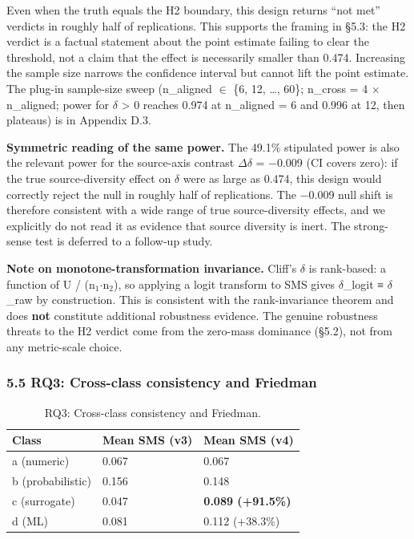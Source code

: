 \documentclass[review,12pt,authoryear]{elsarticle}
\begin{document}
Even when the truth equals the H2 boundary, this design returns ``not
met'' verdicts in roughly half of replications. This supports the
framing in §5.3: the H2 verdict is a factual statement about the point
estimate failing to clear the threshold, not a claim that the effect is
necessarily smaller than 0.474. Increasing the sample size narrows the
confidence interval but cannot lift the point estimate. The plug-in
sample-size sweep (n\_aligned $\in$ \{6, 12, \ldots, 60\}; n\_cross = 4 $\times$
n\_aligned; power for $\delta$ \textgreater{} 0 reaches 0.974 at n\_aligned = 6
and 0.996 at 12, then plateaus) is in Appendix D.3.

\textbf{Symmetric reading of the same power.} The 49.1\% stipulated
power is also the relevant power for the source-axis contrast $\Delta$$\delta$ =
−0.009 (CI covers zero): if the true source-diversity effect on $\delta$ were
as large as 0.474, this design would correctly reject the null in
roughly half of replications. The −0.009 null shift is therefore
consistent with a wide range of true source-diversity effects, and we
explicitly do not read it as evidence that source diversity is inert.
The strong-sense test is deferred to a follow-up study.

\textbf{Note on monotone-transformation invariance.} Cliff's $\delta$ is
rank-based: a function of U / (n$_{1}$$\cdot$n$_{2}$), so applying a logit transform to
SMS gives $\delta$\_logit ≡ $\delta$\_raw by construction. This is consistent with the
rank-invariance theorem and does \textbf{not} constitute additional
robustness evidence. The genuine robustness threats to the H2 verdict
come from the zero-mass dominance (§5.2), not from any metric-scale
choice.

\subsubsection{5.5 RQ3: Cross-class consistency and Friedman}\label{rq3-cross-class-consistency-and-friedman}

{\def\LTcaptype{table} %
\begin{longtable}[]{@{}lll@{}}
\caption{RQ3: Cross-class consistency and Friedman.}\label{tab:p2-12}\\
\toprule\noalign{}
Class & Mean SMS (v3) & Mean SMS (v4) \\
\midrule\noalign{}
\endhead
\bottomrule\noalign{}
\endlastfoot
a (numeric) & 0.067 & 0.067 \\
b (probabilistic) & 0.156 & 0.148 \\
c (surrogate) & 0.047 & \textbf{0.089 (+91.5\%)} \\
d (ML) & 0.081 & 0.112 (+38.3\%) \\
\end{longtable}
}
\end{document}
